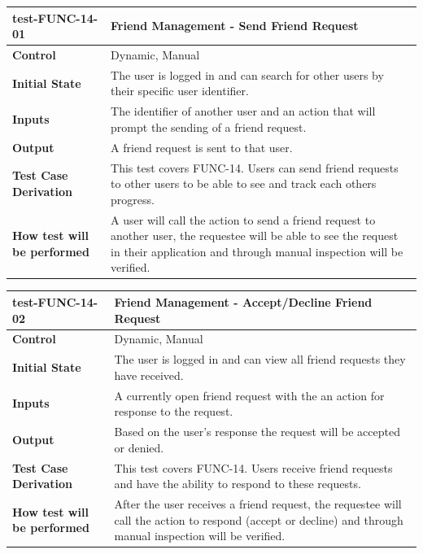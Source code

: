 \documentclass[12pt, titlepage]{article}
\begin{document}
\noindent\begin{tabularx}{\textwidth}{>{\raggedright\arraybackslash}p{3.5cm}X}
  \toprule
  \textbf{test-FUNC-14-01} & \textbf{Friend Management - Send Friend Request}\\
  \midrule
  \textbf{Control} & Dynamic, Manual\\
  \textbf{Initial State} & The user is logged in and can search for other users by their specific user identifier.\\
  \textbf{Inputs} & The identifier of another user and an action that will prompt the sending of a friend request.\\
  \textbf{Output} & A friend request is sent to that user.\\
  \textbf{Test Case Derivation} & This test covers FUNC-14. Users can send friend requests to other users to be able to see and track each others progress.\\
  \textbf{How test will be performed} & A user will call the action to send a friend request to another user, the requestee will be able to see the request in their application and through manual inspection will be verified.\\
  \bottomrule
\end{tabularx}

\vspace{1em}

\noindent\begin{tabularx}{\textwidth}{>{\raggedright\arraybackslash}p{3.5cm}X}
  \toprule
  \textbf{test-FUNC-14-02} & \textbf{Friend Management - Accept/Decline Friend Request}\\
  \midrule
  \textbf{Control} & Dynamic, Manual\\
  \textbf{Initial State} & The user is logged in and can view all friend requests they have received.\\
  \textbf{Inputs} & A currently open friend request with the an action for response to the request.\\
  \textbf{Output} & Based on the user's response the request will be accepted or denied.\\
  \textbf{Test Case Derivation} & This test covers FUNC-14. Users receive friend requests and have the ability to respond to these requests.\\
  \textbf{How test will be performed} & After the user receives a friend request, the requestee will call the action to respond (accept or decline) and through manual inspection will be verified.\\
  \bottomrule
\end{tabularx}
\end{document}
